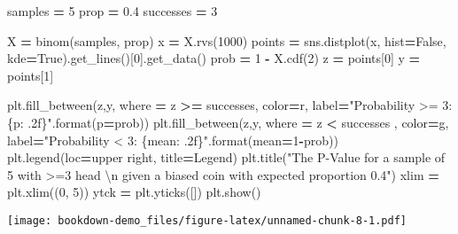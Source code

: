 \documentclass[
]{book}
\newenvironment{Shaded}{\begin{snugshade}}{\end{snugshade}}
\newcommand{\BuiltInTok}[1]{#1}
\newcommand{\CharTok}[1]{\textcolor[rgb]{0.31,0.60,0.02}{#1}}
\newcommand{\DecValTok}[1]{\textcolor[rgb]{0.00,0.00,0.81}{#1}}
\newcommand{\FloatTok}[1]{\textcolor[rgb]{0.00,0.00,0.81}{#1}}
\newcommand{\NormalTok}[1]{#1}
\newcommand{\OperatorTok}[1]{\textcolor[rgb]{0.81,0.36,0.00}{\textbf{#1}}}
\newcommand{\SpecialCharTok}[1]{\textcolor[rgb]{0.00,0.00,0.00}{#1}}
\newcommand{\StringTok}[1]{\textcolor[rgb]{0.31,0.60,0.02}{#1}}
\newcommand{\VariableTok}[1]{\textcolor[rgb]{0.00,0.00,0.00}{#1}}
\theoremstyle{definition}
\theoremstyle{definition}
\theoremstyle{definition}
\theoremstyle{remark}
\begin{document}
\begin{Shaded}
\begin{Highlighting}[]
\NormalTok{samples }\OperatorTok{=} \DecValTok{5}
\NormalTok{prop }\OperatorTok{=} \FloatTok{0.4}
\NormalTok{successes }\OperatorTok{=} \DecValTok{3}

\NormalTok{X }\OperatorTok{=}\NormalTok{ binom(samples, prop)}
\NormalTok{x }\OperatorTok{=}\NormalTok{ X.rvs(}\DecValTok{1000}\NormalTok{)}
\NormalTok{points }\OperatorTok{=}\NormalTok{ sns.distplot(x, hist}\OperatorTok{=}\VariableTok{False}\NormalTok{, kde}\OperatorTok{=}\VariableTok{True}\NormalTok{).get\_lines()[}\DecValTok{0}\NormalTok{].get\_data()}
\NormalTok{prob }\OperatorTok{=} \DecValTok{1} \OperatorTok{{-}}\NormalTok{ X.cdf(}\DecValTok{2}\NormalTok{)}
\NormalTok{z }\OperatorTok{=}\NormalTok{ points[}\DecValTok{0}\NormalTok{]}
\NormalTok{y }\OperatorTok{=}\NormalTok{ points[}\DecValTok{1}\NormalTok{]}

\NormalTok{plt.fill\_between(z,y, where }\OperatorTok{=}\NormalTok{ z }\OperatorTok{\textgreater{}=}\NormalTok{ successes, color}\OperatorTok{=}\StringTok{\textquotesingle{}r\textquotesingle{}}\NormalTok{, label}\OperatorTok{=}\StringTok{"Probability \textgreater{}= 3:}\SpecialCharTok{\{p: .2f\}}\StringTok{"}\NormalTok{.}\BuiltInTok{format}\NormalTok{(p}\OperatorTok{=}\NormalTok{prob))}
\NormalTok{plt.fill\_between(z,y, where }\OperatorTok{=}\NormalTok{ z }\OperatorTok{\textless{}}\NormalTok{ successes , color}\OperatorTok{=}\StringTok{\textquotesingle{}g\textquotesingle{}}\NormalTok{,}
\NormalTok{                 label}\OperatorTok{=}\StringTok{"Probability \textless{} 3: }\SpecialCharTok{\{mean: .2f\}}\StringTok{"}\NormalTok{.}\BuiltInTok{format}\NormalTok{(mean}\OperatorTok{=}\DecValTok{1}\OperatorTok{{-}}\NormalTok{prob))}
\NormalTok{plt.legend(loc}\OperatorTok{=}\StringTok{\textquotesingle{}upper right\textquotesingle{}}\NormalTok{, title}\OperatorTok{=}\StringTok{\textquotesingle{}Legend\textquotesingle{}}\NormalTok{)}
\NormalTok{plt.title(}\StringTok{"The P{-}Value for a sample of 5 with \textgreater{}=3 head }\CharTok{\textbackslash{}n}\StringTok{ given a biased coin with expected proportion 0.4"}\NormalTok{)}
\NormalTok{xlim }\OperatorTok{=}\NormalTok{ plt.xlim((}\DecValTok{0}\NormalTok{, }\DecValTok{5}\NormalTok{))}
\NormalTok{ytck }\OperatorTok{=}\NormalTok{ plt.yticks([])}
\NormalTok{plt.show()}
\end{Highlighting}
\end{Shaded}

\texttt{[image: bookdown-demo\_files/figure-latex/unnamed-chunk-8-1.pdf]}
\end{document}
